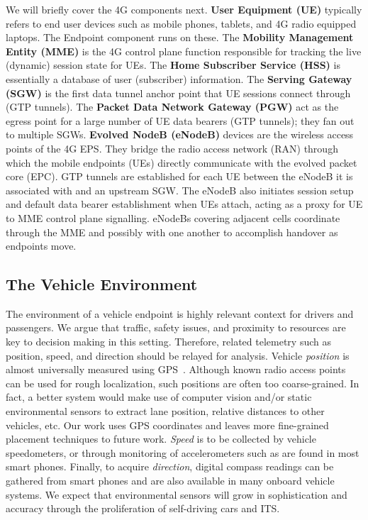We will briefly cover the 4G components next. \textbf{User Equipment
  (UE)} typically refers to end user devices such as mobile phones,
tablets, and 4G radio equipped laptops. The \name Endpoint component
runs on these. The \textbf{Mobility Management Entity (MME)} is the 4G
control plane function responsible for tracking the live (dynamic)
session state for UEs. The \textbf{Home Subscriber Service (HSS)} is
essentially a database of user (subscriber) information. The
\textbf{Serving Gateway (SGW)} is the first data tunnel anchor point
that UE sessions connect through (GTP tunnels). The \textbf{Packet
  Data Network Gateway (PGW)} act as the egress point for a large
number of UE data bearers (GTP tunnels); they fan out to multiple
SGWs.  \textbf{Evolved NodeB (eNodeB)} devices are the wireless access
points of the 4G EPS. They bridge the radio access network (RAN)
through which the mobile endpoints (UEs) directly communicate with the
evolved packet core (EPC). GTP tunnels are established for each UE
between the eNodeB it is associated with and an upstream SGW.  The
eNodeB also initiates session setup and default data bearer
establishment when UEs attach, acting as a proxy for UE to MME
control plane signalling. eNodeBs covering adjacent cells coordinate
through the MME and possibly with one another to accomplish handover
as endpoints move.

\subsection{The Vehicle Environment}

The environment of a vehicle endpoint is highly relevant context for
drivers and passengers. We argue that traffic, safety issues, and
proximity to resources are key to decision making in this
setting. Therefore, related telemetry such as position, speed, and
direction should be relayed for analysis. Vehicle \emph{position} is
almost universally measured using GPS~\cite{misra2006global}.
Although known radio access points can be used for rough localization,
such positions are often too coarse-grained.  In fact, a better system
would make use of computer vision and/or static environmental sensors
to extract lane position, relative distances to other vehicles, etc.
Our work uses GPS coordinates and leaves more fine-grained placement
techniques to future work. \emph{Speed} is to be collected by vehicle
speedometers, or through monitoring of accelerometers such as are
found in most smart phones. Finally, to acquire \emph{direction},
digital compass readings can be gathered from smart phones and are
also available in many onboard vehicle systems.  We expect that
environmental sensors will grow in sophistication and accuracy through
the proliferation of self-driving cars and ITS.
